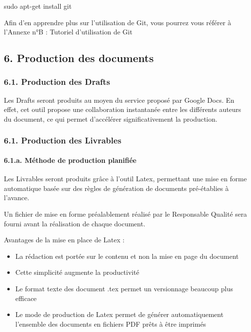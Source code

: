 \documentclass{article}
\begin{document}
sudo apt-get install git


\bigskip

Afin d’en apprendre plus sur l’utilisation de Git, vous pourrez vous
référer à l’Annexe n°B : Tutoriel d’utilisation de Git

\subsection[6. Production des documents]{6. Production des documents}
\subsubsection[6.1. Production des Drafts]{6.1. Production des Drafts}
Les Drafts seront produits au moyen du service proposé par Google Docs.
En effet, cet outil propose une collaboration instantanée entre les
différents auteurs du document, ce qui permet d’accélérer
significativement la production.

\subsubsection[6.1. Production des Livrables]{6.1. Production des
Livrables}
\paragraph[6.1.a. Méthode de production planifiée]{6.1.a. Méthode de
production planifiée}
Les Livrables seront produits grâce à l’outil Latex, permettant une mise
en forme automatique basée sur des règles de génération de documents
pré-établies à l’avance.


\bigskip

Un fichier de mise en forme préalablement réalisé par le Responsable
Qualité sera fourni avant la réalisation de chaque document.


\bigskip

Avantages de la mise en place de Latex :

\begin{itemize}
\item La rédaction est portée sur le contenu et non la mise en page du
document
\item Cette simplicité augmente la productivité
\item Le format texte des document .tex permet un versionnage beaucoup
plus efficace
\item Le mode de production de Latex permet de générer automatiquement
l’ensemble des documents en fichiers PDF prêts à être imprimés
\end{itemize}
\end{document}
